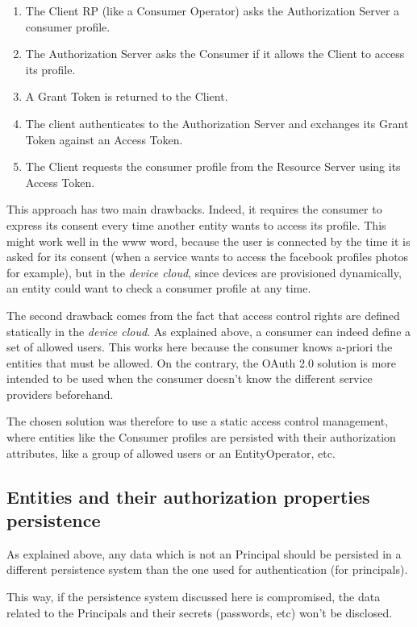 \begin{enumerate}
	\item The Client RP (like a Consumer Operator) asks the Authorization Server a consumer profile.
	\item The Authorization Server asks the Consumer if it allows the Client to access its profile.
	\item A Grant Token is returned to the Client.
	\item The client authenticates to the Authorization Server and exchanges its Grant Token against an Access Token.
	\item The Client requests the consumer profile from the Resource Server using its Access Token.
\end{enumerate}

This approach has two main drawbacks. Indeed, it requires the consumer to express its consent every time another entity wants to access its profile. This might work well in the www word, because the user is connected by the time it is asked for its consent (when a service wants to access the facebook profiles photos for example), but in the \emph{device cloud}, since devices are provisioned dynamically, an entity could want to check a consumer profile at any time.

The second drawback comes from the fact that access control rights are defined statically in the \emph{device cloud}. As explained above, a consumer can indeed define a set of allowed users. This works here because the consumer knows a-priori the entities that must be allowed. On the contrary, the OAuth 2.0 solution is more intended to be used when the consumer doesn't know the different service providers beforehand.

The chosen solution was therefore to use a static access control management, where entities like the Consumer profiles are persisted with their authorization attributes, like a group of allowed users or an EntityOperator, etc.

\subsection{Entities and their authorization properties persistence}
\label{sec:03_database}
As explained above, any data which is not an Principal should be persisted in a different persistence system than the one used for authentication (for principals).

This way, if the persistence system discussed here is compromised, the data related to the Principals and their secrets (passwords, etc) won't be disclosed.

